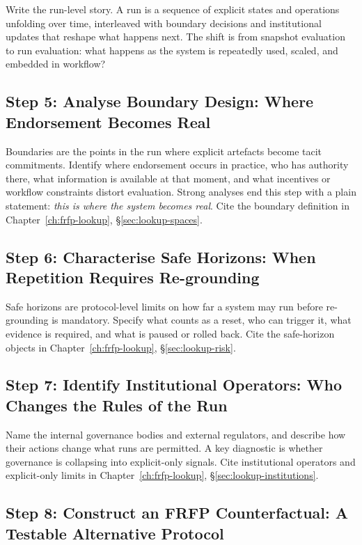 Write the run-level story. A run is a sequence of explicit states and operations unfolding over time, interleaved with boundary decisions and institutional updates that reshape what happens next. The shift is from snapshot evaluation to run evaluation: what happens as the system is repeatedly used, scaled, and embedded in workflow?

\subsection{Step 5: Analyse Boundary Design: Where Endorsement Becomes Real}

Boundaries are the points in the run where explicit artefacts become tacit commitments. Identify where endorsement occurs in practice, who has authority there, what information is available at that moment, and what incentives or workflow constraints distort evaluation. Strong analyses end this step with a plain statement: \emph{this is where the system becomes real}. Cite the boundary definition in Chapter~\ref{ch:frfp-lookup}, \S\ref{sec:lookup-spaces}.

\subsection{Step 6: Characterise Safe Horizons: When Repetition Requires Re-grounding}

Safe horizons are protocol-level limits on how far a system may run before re-grounding is mandatory. Specify what counts as a reset, who can trigger it, what evidence is required, and what is paused or rolled back. Cite the safe-horizon objects in Chapter~\ref{ch:frfp-lookup}, \S\ref{sec:lookup-risk}.

\subsection{Step 7: Identify Institutional Operators: Who Changes the Rules of the Run}

Name the internal governance bodies and external regulators, and describe how their actions change what runs are permitted. A key diagnostic is whether governance is collapsing into explicit-only signals. Cite institutional operators and explicit-only limits in Chapter~\ref{ch:frfp-lookup}, \S\ref{sec:lookup-institutions}.

\subsection{Step 8: Construct an FRFP Counterfactual: A Testable Alternative Protocol}

